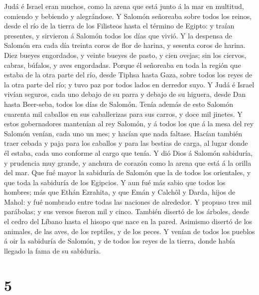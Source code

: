  Judá é Israel eran muchos, como la arena que está junto á
la mar en multitud, comiendo y bebiendo y alegrándose.  Y
Salomón señoreaba sobre todos los reinos, desde el río de la tierra de
los Filisteos hasta el término de Egipto: y traían presentes, y
sirvieron á Salomón todos los días que vivió.  Y la
despensa de Salomón era cada día treinta coros de flor de harina, y
sesenta coros de harina.  Diez bueyes engordados, y veinte
bueyes de pasto, y cien ovejas; sin los ciervos, cabras, búfalos, y aves
engordadas.  Porque él señoreaba en toda la región que
estaba de la otra parte del río, desde Tiphsa hasta Gaza, sobre todos
los reyes de la otra parte del río; y tuvo paz por todos lados en
derredor suyo.  Y Judá é Israel vivían seguros, cada uno
debajo de su parra y debajo de su higuera, desde Dan hasta Beer-seba,
todos los días de Salomón.  Tenía además de esto Salomón
cuarenta mil caballos en sus caballerizas para sus carros, y doce mil
jinetes.  Y estos gobernadores mantenían al rey Salomón, y
á todos los que á la mesa del rey Salomón venían, cada uno un mes; y
hacían que nada faltase.  Hacían también traer cebada y
paja para los caballos y para las bestias de carga, al lugar donde él
estaba, cada uno conforme al cargo que tenía.  Y dió Dios á
Salomón sabiduría, y prudencia muy grande, y anchura de corazón como la
arena que está á la orilla del mar.  Que fué mayor la
sabiduría de Salomón que la de todos los orientales, y que toda la
sabiduría de los Egipcios.  Y aun fué más sabio que todos
los hombres; más que Ethán Ezrahita, y que Emán y Calchôl y Darda, hijos
de Mahol: y fué nombrado entre todas las naciones de alrededor.
 Y propuso tres mil parábolas; y sus versos fueron mil y
cinco.  También disertó de los árboles, desde el cedro del
Líbano hasta el hisopo que nace en la pared. Asimismo disertó de los
animales, de las aves, de los reptiles, y de los peces.  Y
venían de todos los pueblos á oir la sabiduría de Salomón, y de todos
los reyes de la tierra, donde había llegado la fama de su sabiduría.

\hypertarget{section-4}{%
\section{5}\label{section-4}}

